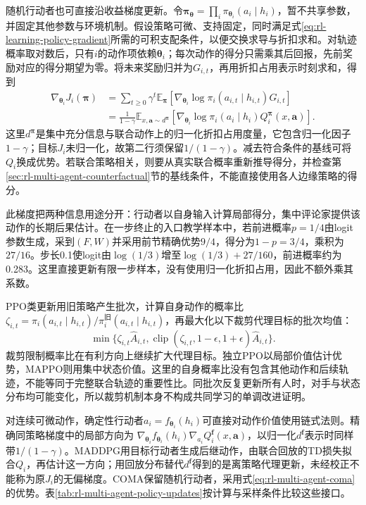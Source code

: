 随机行动者也可直接沿收益梯度更新。令$\bm\pi_{\bm\theta}=\prod_i\pi_{\bm\theta_i}(a_i\mid h_i)$，暂不共享参数，并固定其他参数与环境机制。假设策略可微、支持固定，同时满足式\eqref{eq:rl-learning-policy-gradient}所需的可积支配条件，以便交换求导与折扣求和。对轨迹概率取对数后，只有$i$的动作项依赖$\bm\theta_i$；每次动作的得分只需乘其后回报，先前奖励对应的得分期望为零。将未来奖励归并为$G_{i,t}$，再用折扣占用表示时刻求和，得到
\begin{align}
 \nabla_{\bm\theta_i}J_i(\bm\pi)
 &=\sum_{t\geq0}\gamma^t
   \mathbb E_{\bm\pi}
   [\nabla_{\bm\theta_i}\log\pi_i(a_{i,t}\mid h_{i,t})G_{i,t}]
 \nonumber\\
 &=\frac{1}{1-\gamma}
   \mathbb E_{x,\bm a\sim d^{\bm\pi}}
   [\nabla_{\bm\theta_i}\log\pi_i(a_i\mid h_i)
           Q_i^{\bm\pi}(x,\bm a)].
 \label{eq:rl-multi-agent-policy-gradient}
\end{align}
这里$d^{\bm\pi}$是集中充分信息与联合动作上的归一化折扣占用度量，它包含归一化因子$1-\gamma$；目标$J_i$未归一化，故第二行须保留$1/(1-\gamma)$。减去符合条件的基线可将$Q_i$换成优势。若联合策略相关，则要从真实联合概率重新推导得分，并检查第\ref{sec:rl-multi-agent-counterfactual}节的基线条件，不能直接使用各人边缘策略的得分。

此梯度把两种信息用途分开：行动者以自身输入计算局部得分，集中评论家提供该动作的长期后果估计。在一步终止的入口教学样本中，若前进概率$p=1/4$由logit参数生成，采到$(F,W)$并采用前节精确优势$9/4$，得分为$1-p=3/4$，乘积为$27/16$。步长0.1使logit由$\log(1/3)$增至$\log(1/3)+27/160$，前进概率约为0.283。这里直接更新有限一步样本，没有使用归一化折扣占用，因此不额外乘其系数。

PPO类更新用旧策略产生批次，计算自身动作的概率比$\zeta_{i,t}=\pi_i(a_{i,t}\mid h_{i,t})/
\pi_i^{\text{旧}}(a_{i,t}\mid h_{i,t})$，再最大化以下裁剪代理目标的批次均值：
\[
 \min\{\zeta_{i,t}\widehat A_{i,t},
       \operatorname{clip}(\zeta_{i,t},1-\epsilon,1+\epsilon)
                      \widehat A_{i,t}\}.
\]
裁剪限制概率比在有利方向上继续扩大代理目标。独立PPO以局部价值估计优势，MAPPO则用集中状态价值。这里的自身概率比没有包含其他动作和后续轨迹，不能等同于完整联合轨迹的重要性比。同批次反复更新所有人时，对手与状态分布均可能变化，所以裁剪机制本身不构成共同学习的单调改进证明。

对连续可微动作，确定性行动者$a_i=f_{\bm\theta_i}(h_i)$可直接对动作价值使用链式法则。精确同策略梯度中的局部方向为
$\nabla_{\bm\theta_i}f_{\bm\theta_i}(h_i)\nabla_{a_i}Q_i^{\bm f}(x,\bm a)$，以归一化$d^{\bm f}$表示时同样带$1/(1-\gamma)$。MADDPG用目标行动者生成后继动作，由联合回放的TD损失拟合$Q_i$，再估计这一方向；用回放分布替代$d^{\bm f}$得到的是离策略代理更新，未经校正不能称为原$J_i$的无偏梯度。COMA保留随机行动者，采用式\eqref{eq:rl-multi-agent-coma}的优势。表\ref{tab:rl-multi-agent-policy-updates}按计算与采样条件比较这些接口。

